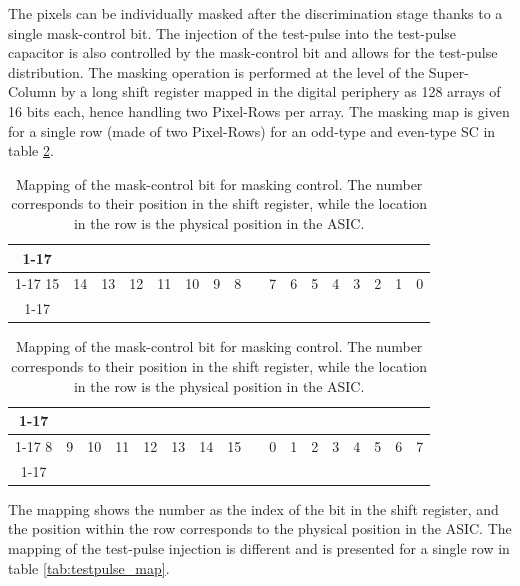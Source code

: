 			The pixels can be individually masked after the discrimination stage thanks to a single mask-control bit. The injection of the test-pulse into the test-pulse capacitor is also controlled by the mask-control bit and allows for the test-pulse distribution. The masking operation is performed at the level of the Super-Column by a long shift register mapped in the digital periphery as 128 arrays of 16 bits each, hence handling two Pixel-Rows per array. The masking map is given for a single row (made of two Pixel-Rows) for an odd-type and even-type SC in table \ref{tab:masking_map}.
			\begin{table}[h]
				\centering
				\renewcommand{\arraystretch}{1.2}
				\begin{tabular}{|c|c|c|c|c|c|c|c|c|c|c|c|c|c|c|c|c|}
				\cline{1-17}
				\multicolumn{17}{|c|}{\textbf{Masking map for odd-type SC}} \\ 
				\cline{1-17}
				15 & 14 & 13 & 12 & 11 & 10 & 9 & 8 & \hspace{4mm} & 7 & 6 & 5 & 4 & 3 & 2 & 1 & 0 \\
				\cline{1-17}
				\end{tabular}
				
				\vspace{4mm}
				\begin{tabular}{|c|c|c|c|c|c|c|c|c|c|c|c|c|c|c|c|c|}
				\cline{1-17}
				\multicolumn{17}{|c|}{\textbf{Masking map for even-type SC}} \\ 
				\cline{1-17}
				8 & 9 & 10 & 11 & 12 & 13 & 14 & 15 & \hspace{4mm} & 0 & 1 & 2 & 3 & 4 & 5 & 6 & 7  \\
				\cline{1-17}
				\end{tabular}
				\caption{Mapping of the mask-control bit for masking control. The number corresponds to their position in the shift register, while the location in the row is the physical position in the ASIC.}
				\label{tab:masking_map} 
			\end{table}
			
			The mapping shows the number as the index of the bit in the shift register, and the position within the row corresponds to the physical position in the ASIC. The mapping of the test-pulse injection is different and is presented for a single row in table \ref{tab:testpulse_map}.
			
